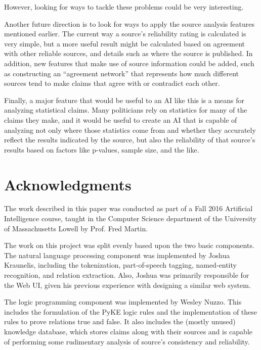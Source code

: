 \documentclass{chi2009}
\begin{document}
However, looking for ways to tackle these problems could be very interesting.

Another future direction is to look for ways to apply the source analysis features mentioned earlier.
The current way a source's reliability rating is calculated is very simple, but a more useful result might be calculated based on agreement with other reliable sources, and details such as where the source is published.
In addition, new features that make use of source information could be added, such as constructing an ``agreement network'' that represents how much different sources tend to make claims that agree with or contradict each other.

Finally, a major feature that would be useful to an AI like this is a means for analyzing statistical claims.
Many politicians rely on statistics for many of the claims they make, and it would be useful to create an AI that is capable of analyzing not only where those statistics come from and whether they accurately reflect the results indicated by the source, but also the reliability of that source's results based on factors like p-values, sample size, and the like.

\section{Acknowledgments}

The work described in this paper was conducted as part of a Fall 2016 Artificial Intelligence course, taught in the Computer Science department of the University of Massachusetts Lowell by Prof. Fred Martin.

The work on this project was split evenly based upon the two basic components.  The natural language processing component was implemented by Joshua Kraunelis, including the tokenization, part-of-speech tagging, named-entity recognition, and relation extraction.  Also, Joshua was primarily responsible for the Web UI, given his previous experience with designing a similar web system.

The logic programming component was implemented by Wesley Nuzzo. This includes the formulation of the PyKE logic rules and the implementation of these rules to prove relations true and false. It also includes the (mostly unused) knowledge database, which stores claims along with their sources and is capable of performing some rudimentary analysis of source's consistency and reliability.



\end{document}
